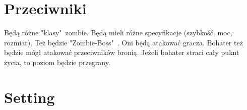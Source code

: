 \documentclass[letterpaper,12pt]{report}
\begin{document}
	\section{Przeciwniki}
	
	Będą różne "klasy"\ zombie. Będą mieli różne specyfikacje 
	(szybkość, moc, rozmiar). Też będzie "Zombie-Boss"\ .
	Oni będą atakować gracza. Bohater też będzie mógł atakować
	przeciwników bronią. Jeżeli bohater straci cały puknt
	życia, to poziom będzie przegrany. 
	
	\section{Setting}
\end{document}
